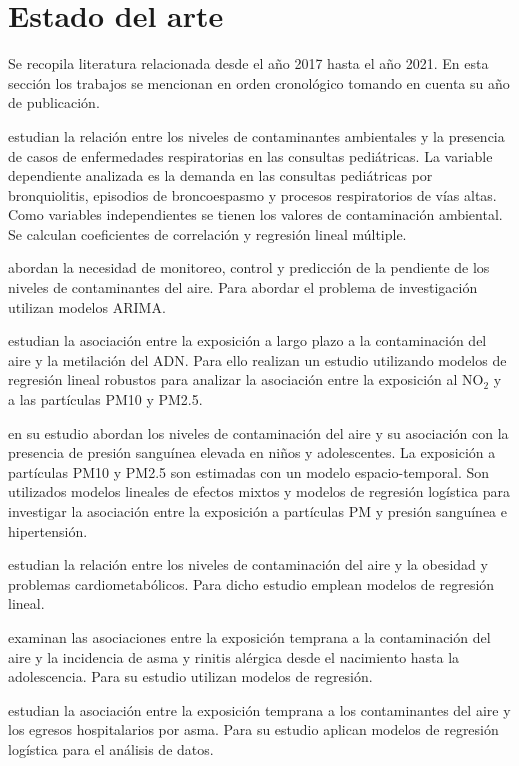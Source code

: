 \documentclass[3p,times]{elsarticle}
\begin{document}
\section{Estado del arte}

Se recopila literatura relacionada desde el año 2017 hasta el año 2021. En esta sección los trabajos se mencionan en orden cronológico tomando en cuenta su año de publicación.

\citet{r12} estudian la relación entre los niveles de contaminantes ambientales y la presencia de casos de enfermedades respiratorias en las consultas pediátricas. La variable dependiente analizada es la demanda en las consultas pediátricas por bronquiolitis, episodios de broncoespasmo y procesos respiratorios de vías altas. Como variables independientes se tienen los valores de contaminación ambiental. Se calculan coeficientes de correlación y regresión lineal múltiple.

\citet{r13} abordan la necesidad de monitoreo, control y predicción de la pendiente de los niveles de contaminantes del aire. Para abordar el problema de investigación utilizan modelos ARIMA. 

\citet{r14} estudian la asociación entre la exposición a largo plazo a la contaminación del aire y la metilación del ADN. Para ello realizan un estudio utilizando modelos de regresión lineal robustos para analizar la asociación entre la exposición al NO$_2$ y a las partículas PM10 y PM2.5.

\citet{r15} en su estudio abordan los niveles de contaminación del aire y su asociación con la presencia de presión sanguínea elevada en niños y adolescentes. La exposición a partículas PM10 y PM2.5 son estimadas con un modelo espacio-temporal. Son utilizados modelos lineales de efectos mixtos y modelos de regresión logística para investigar la asociación entre la exposición a partículas PM y presión sanguínea e hipertensión. 

\citet{r16} estudian la relación entre los niveles de contaminación del aire y la obesidad y problemas cardiometabólicos. Para dicho estudio emplean modelos de regresión lineal.

\citet{r17} examinan las asociaciones entre la exposición temprana a la contaminación del aire y la incidencia de asma y rinitis alérgica desde el nacimiento hasta la adolescencia. Para su estudio utilizan modelos de regresión.

\citet{r18} estudian la asociación entre la exposición temprana a los contaminantes del aire y los egresos hospitalarios por asma. Para su estudio aplican modelos de regresión logística para el análisis de datos. 
\end{document}
